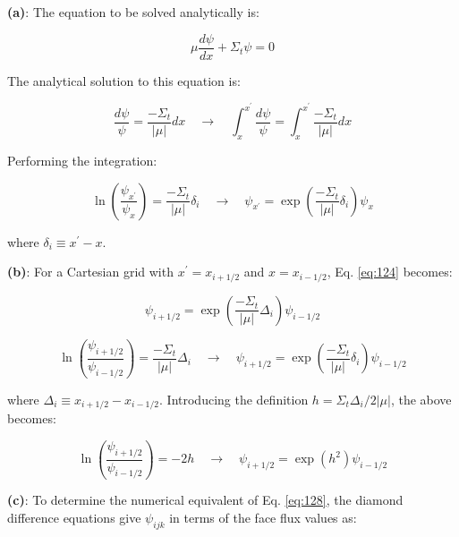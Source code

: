 \documentclass[10pt]{article}
\begin{document}
\textbf{(a)}: The equation to be solved analytically is:

\begin{equation}
\label{eq:Ex2}
\mu\frac{d\psi}{dx}+\Sigma_t\psi=0
\end{equation}

The analytical solution to this equation is:

\begin{equation}
\frac{d\psi}{\psi}=\frac{-\Sigma_t}{|\mu|}dx\quad\rightarrow\quad\int_{x}^{x^{'}}\frac{d\psi}{\psi}=\int_{x}^{x^{'}}\frac{-\Sigma_t}{|\mu|}dx
\end{equation}

Performing the integration:

\begin{equation}
\label{eq:124}
\ln{\left(\frac{\psi_{x^{'}}}{\psi_{x}}\right)}=\frac{-\Sigma_t}{|\mu|}\delta_i\quad\rightarrow\quad\psi_{x^{'}}=\exp{\left(\frac{-\Sigma_t}{|\mu|}\delta_i\right)}\psi_{x}
\end{equation}

where \(\delta_i\equiv x^{'}-x\).\newline

\textbf{(b)}: For a Cartesian grid with \(x^{'}=x_{i+1/2}\) and \(x=x_{i-1/2}\), Eq. \eqref{eq:124} becomes:

\begin{equation}
\label{eq:128}
\psi_{i+1/2}=\exp{\left(\frac{-\Sigma_t}{|\mu|}\Delta_i\right)}\psi_{i-1/2}
\end{equation}

\begin{equation}
\label{eq:1241}
\ln{\left(\frac{\psi_{i+1/2}}{\psi_{i-1/2}}\right)}=\frac{-\Sigma_t}{|\mu|}\Delta_i\quad\rightarrow\quad\psi_{i+1/2}=\exp{\left(\frac{-\Sigma_t}{|\mu|}\delta_i\right)}\psi_{i-1/2}
\end{equation}

where \(\Delta_i\equiv x_{i+1/2}-x_{i-1/2}\). Introducing the definition \(h=\Sigma_t\Delta_i/2|\mu|\), the above becomes:

\begin{equation}
\label{eq:128}
\ln{\left(\frac{\psi_{i+1/2}}{\psi_{i-1/2}}\right)}=-2h\quad\rightarrow\quad\psi_{i+1/2}=\exp{\left(h^2\right)}\psi_{i-1/2}
\end{equation}

\textbf{(c)}: To determine the numerical equivalent of Eq. \eqref{eq:128}, the diamond difference equations give \(\psi_{ijk}\) in terms of the face flux values as:
\end{document}
